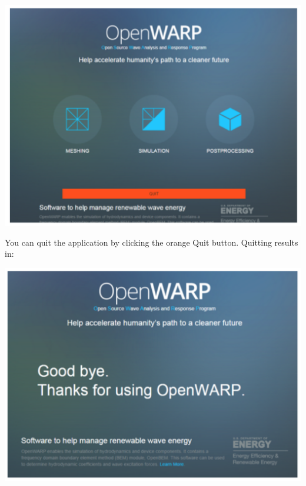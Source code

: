 \documentclass[12pt]{article}
\begin{document}
	\vspace{\abovedisplayskip}
	\begin{minipage}{\linewidth}
		\centering
		\includegraphics[scale=0.4]{img/20}
	\end{minipage}
	\vspace{\belowdisplayskip}
	
	You can quit the application by clicking the orange Quit button. Quitting results in:
	
		\vspace{\abovedisplayskip}
		\begin{minipage}{\linewidth}
			\centering
			\includegraphics[scale=0.5]{img/21}
		\end{minipage}
		\vspace{\belowdisplayskip}
		
\end{document}
